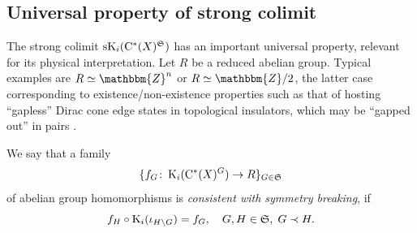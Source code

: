 \documentclass{amsart}
\numberwithin{figure}{section}
\numberwithin{equation}{section}
\numberwithin{table}{section}
\theoremstyle{plain}
\theoremstyle{definition}
\theoremstyle{remark}
\theoremstyle{nonumber}
\newcommand{\Z}{\mathbb{Z}}
\newcommand{\K}{\relax\ifmmode\operatorname{K}\else\textup{K}\fi}
\newcommand{\Cst}{\relax\ifmmode\mathrm{C}^*\else\textup{C*}\fi}
\renewcommand{\mathbb}{\mathbbm} %
\begin{document}
\subsection{Universal property of strong colimit}
\label{sec:universal_strong_colimit}
The strong colimit ${\rm sK}_i(\Cst(X)^\mathfrak{S})$ has an important
universal property, relevant for its physical interpretation. Let $R$ be a
reduced abelian group. Typical examples are $R\simeq\Z^n$ or $R\simeq\Z/2$,
the latter case corresponding to existence/non-existence properties such as
that of hosting ``gapless'' Dirac cone edge states in topological
insulators, which may be ``gapped out'' in pairs
\cites{Fu-Kane-Mele:TI_in_3D, Gomi-Thiang:Real_gerbes,Hasan-Moore:3D_TI}. 

We say that a family
\begin{equation}\label{eq:maps.to.reduced} 
\{f_G\colon \K_i(\Cst(X)^G)\to R\}_{G\in \mathfrak{S}}
\end{equation}
of abelian group homomorphisms is \emph{consistent with symmetry breaking}, if
\begin{equation}\label{eq:consistent.symm.break}
f_H\circ\K_i(\iota_{H\backslash
G})=f_G,\quad G,H\in\mathfrak{S},\;G\prec H.
\end{equation}
\end{document}
